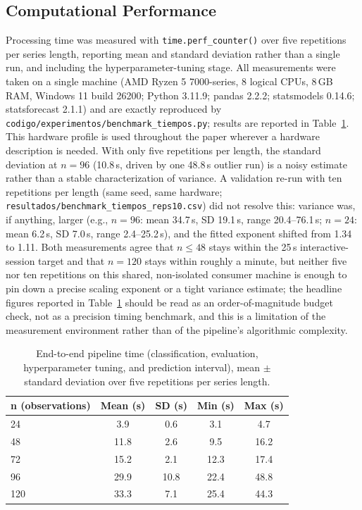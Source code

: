 \documentclass[forecasting,article,submit,pdftex,moreauthors]{Definitions/mdpi}
\begin{document}
\subsection{Computational Performance}
\label{sec:computo}

Processing time was measured with \texttt{time.perf\_\allowbreak counter()} over five repetitions per series length, reporting mean and standard deviation rather than a single run, and including the hyperparameter-tuning stage. All measurements were taken on a single machine (AMD Ryzen 5 7000-series, 8 logical CPUs, 8\,GB RAM, Windows 11 build 26200; Python 3.11.9; pandas 2.2.2; statsmodels 0.14.6; statsforecast 2.1.1) and are exactly reproduced by \texttt{codigo/\allowbreak experimentos/\allowbreak benchmark\_\allowbreak tiempos.py}; results are reported in Table~\ref{tab:tiempos}. This hardware profile is used throughout the paper wherever a hardware description is needed. With only five repetitions per length, the standard deviation at $n=96$ (10.8\,s, driven by one 48.8\,s outlier run) is a noisy estimate rather than a stable characterization of variance. A validation re-run with ten repetitions per length (same seed, same hardware; \texttt{resultados/\allowbreak benchmark\_\allowbreak tiempos\_\allowbreak reps10.csv}) did not resolve this: variance was, if anything, larger (e.g., $n=96$: mean 34.7\,s, SD 19.1\,s, range 20.4--76.1\,s; $n=24$: mean 6.2\,s, SD 7.0\,s, range 2.4--25.2\,s), and the fitted exponent shifted from 1.34 to 1.11. Both measurements agree that $n\leq48$ stays within the 25\,s interactive-session target and that $n=120$ stays within roughly a minute, but neither five nor ten repetitions on this shared, non-isolated consumer machine is enough to pin down a precise scaling exponent or a tight variance estimate; the headline figures reported in Table~\ref{tab:tiempos} should be read as an order-of-magnitude budget check, not as a precision timing benchmark, and this is a limitation of the measurement environment rather than of the pipeline's algorithmic complexity.

\begin{table}[H]
\caption{End-to-end pipeline time (classification, evaluation, hyperparameter tuning, and prediction interval), mean $\pm$ standard deviation over five repetitions per series length.\label{tab:tiempos}}
\centering
\begin{tabularx}{\textwidth}{Xcccc}
\toprule
\textbf{n (observations)} & \textbf{Mean (s)} & \textbf{SD (s)} & \textbf{Min (s)} & \textbf{Max (s)} \\
\midrule
24  & 3.9  & 0.6  & 3.1  & 4.7  \\
48  & 11.8 & 2.6  & 9.5  & 16.2 \\
72  & 15.2 & 2.1  & 12.3 & 17.4 \\
96  & 29.9 & 10.8 & 22.4 & 48.8 \\
120 & 33.3 & 7.1  & 25.4 & 44.3 \\
\bottomrule
\end{tabularx}
\end{table}
\end{document}
